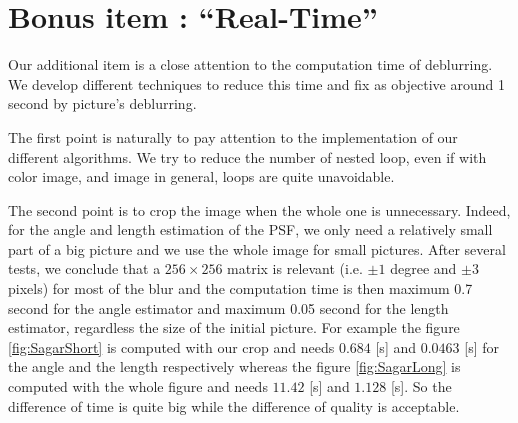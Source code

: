 \section{Bonus item : ``Real-Time''}
\label{sec:RealTime}
Our additional item is a close attention to the computation time of deblurring.
We develop different techniques to reduce this time and fix as objective around 1 second by picture's deblurring.

The first point is naturally to pay attention to the implementation of our different algorithms. We try to reduce the number of nested loop, even if with color image, and image in general, loops are quite unavoidable.

The second point is to crop the image when the whole one is unnecessary. Indeed, for the angle and length estimation of the PSF, we only need a relatively small part of a big picture and we  use the whole image for small pictures. After several tests, we conclude that a $256 \times 256 $ matrix is relevant (i.e. $\pm 1$ degree and $\pm 3$ pixels) for most of the blur and the computation time is then maximum 0.7 second for the angle estimator and maximum 0.05 second for the length estimator, regardless the size of the initial picture. For example the figure \ref{fig:SagarShort} is computed with our crop and needs $0.684 $ [s] and $0.0463$ [s] for the angle and the length respectively whereas the figure \ref{fig:SagarLong} is computed with the whole figure and needs $11.42$ [s] and $1.128$ [s]. So the difference of time is quite big while the difference of quality is acceptable. 


